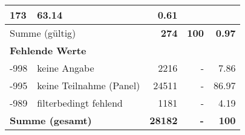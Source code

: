 \begin{longtable}{lXrrr}
       \num{173} &
       \num[round-mode=places,round-precision=2]{63,14} &
         \num[round-mode=places,round-precision=2]{0,61} \\
     \midrule
     \multicolumn{2}{l}{Summe (gültig)} &
       \textbf{\num{274}} &
     \textbf{100} &
       \textbf{\num[round-mode=places,round-precision=2]{0,97}} \\
     \multicolumn{5}{l}{\textbf{Fehlende Werte}}\\
       -998 &
       keine Angabe &
         \num{2216} &
        - &
         \num[round-mode=places,round-precision=2]{7,86} \\
       -995 &
       keine Teilnahme (Panel) &
         \num{24511} &
        - &
         \num[round-mode=places,round-precision=2]{86,97} \\
       -989 &
       filterbedingt fehlend &
         \num{1181} &
        - &
         \num[round-mode=places,round-precision=2]{4,19} \\
     \midrule
     \multicolumn{2}{l}{\textbf{Summe (gesamt)}} &
          \textbf{\num{28182}} &
        \textbf{-} &
        \textbf{100} \\
     \bottomrule
     \end{longtable}
     

